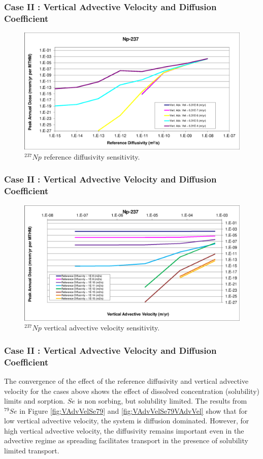 \begin{frame}[c]
  \frametitle{Case II : Vertical Advective Velocity and Diffusion Coefficient}
\begin{figure}[htp!]
\centering
\includegraphics[width=\linewidth]{AdvVelAndDiffCoeffEBSFail/Np-237.eps}
\caption{$^{237}Np$ reference diffusivity sensitivity.}
\label{fig:VAdvVelNp237}
\end{figure}
\end{frame}

\begin{frame}[c]
  \frametitle{Case II : Vertical Advective Velocity and Diffusion Coefficient}
\begin{figure}[ht!]
\centering
\includegraphics[width=\linewidth]{AdvVelAndDiffCoeffEBSFail/Np-237-VAdvVel.eps}
\caption{$^{237}Np$ vertical advective velocity sensitivity.}
\label{fig:VAdvVelNp237VAdvVel}
\end{figure}
\end{frame}
  

\begin{frame}[c]
  \frametitle{Case II : Vertical Advective Velocity and Diffusion Coefficient}
The convergence of the effect of the reference diffusivity and vertical 
advective velocity for the cases above shows the effect of dissolved 
concentration (solubility) limits and sorption. $Se$ is non sorbing, but 
solubility limited.  The results from $^{79}Se$ in Figure \ref{fig:VAdvVelSe79} 
and \ref{fig:VAdvVelSe79VAdvVel} show that for low vertical advective velocity, 
the system is diffusion dominated.  However, for high vertical advective 
velocity, the diffusivity remains important even in the advective regime as 
spreading facilitates transport in the presence of solubility limited transport. 
\end{frame}

